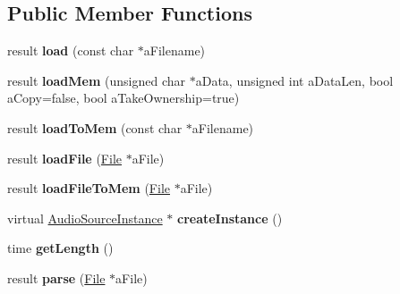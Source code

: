 \subsection*{Public Member Functions}
\begin{DoxyCompactItemize}
\item 
\mbox{\label{class_so_loud_1_1_wav_stream_a773cedad6f1633b4eb82594147964ca1}} 
result {\bfseries load} (const char $\ast$a\+Filename)
\item 
\mbox{\label{class_so_loud_1_1_wav_stream_a14bbfdad0390548cea4bb6dd2a5339f8}} 
result {\bfseries load\+Mem} (unsigned char $\ast$a\+Data, unsigned int a\+Data\+Len, bool a\+Copy=false, bool a\+Take\+Ownership=true)
\item 
\mbox{\label{class_so_loud_1_1_wav_stream_a03f942b0777845f796a72164bdd88f24}} 
result {\bfseries load\+To\+Mem} (const char $\ast$a\+Filename)
\item 
\mbox{\label{class_so_loud_1_1_wav_stream_a82ed0d1c2d46674af996dacda3476f14}} 
result {\bfseries load\+File} (\mbox{\hyperlink{class_so_loud_1_1_file}{File}} $\ast$a\+File)
\item 
\mbox{\label{class_so_loud_1_1_wav_stream_a4ae9a4f93ae01b753be32723fd3ebd8a}} 
result {\bfseries load\+File\+To\+Mem} (\mbox{\hyperlink{class_so_loud_1_1_file}{File}} $\ast$a\+File)
\item 
\mbox{\label{class_so_loud_1_1_wav_stream_a04a870fc47575ae432ed14d98bcf2470}} 
virtual \mbox{\hyperlink{class_so_loud_1_1_audio_source_instance}{Audio\+Source\+Instance}} $\ast$ {\bfseries create\+Instance} ()
\item 
\mbox{\label{class_so_loud_1_1_wav_stream_a31e52783f116e35a9556de2bb0bbc21e}} 
time {\bfseries get\+Length} ()
\item 
\mbox{\label{class_so_loud_1_1_wav_stream_a51f8c2a96dc01eec1c614a0a4a165bdf}} 
result {\bfseries parse} (\mbox{\hyperlink{class_so_loud_1_1_file}{File}} $\ast$a\+File)
\end{DoxyCompactItemize}
